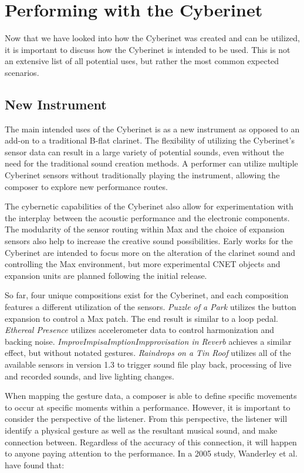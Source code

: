 \chapter{Performing with the Cyberinet}
Now that we have looked into how the Cyberinet was created and can be utilized, it is important to discuss how the Cyberinet is intended to be used. This is not an extensive list of all potential uses, but rather the most common expected scenarios.

\section{New Instrument}
The main intended uses of the Cyberinet is as a new instrument as opposed to an add-on to a traditional B-flat clarinet. The flexibility of utilizing the Cyberinet's sensor data can result in a large variety of potential sounds, even without the need for the traditional sound creation methods. A performer can utilize multiple Cyberinet sensors without traditionally playing the instrument, allowing the composer to explore new performance routes.

The cybernetic capabilities of the Cyberinet also allow for experimentation with the interplay between the acoustic performance and the electronic components. The modularity of the sensor routing within Max and the choice of expansion sensors also help to increase the creative sound possibilities. Early works for the Cyberinet are intended to focus more on the alteration of the clarinet sound and controlling the Max environment, but more experimental CNET objects and expansion units are planned following the initial release.

So far, four unique compositions exist for the Cyberinet, and each composition features a different utilization of the sensors. \textit{Puzzle of a Park} utilizes the button expansion to control a Max patch. The end result is similar to a loop pedal. \textit{Ethereal Presence} utilizes accelerometer data to control harmonization and backing noise. \textit{ImprovImpisaImptionImpprovisation in Reverb} achieves a similar effect, but without notated gestures. \textit{Raindrops on a Tin Roof} utilizes all of the available sensors in version 1.3 to trigger sound file play back, processing of live and recorded sounds, and live lighting changes.

When mapping the gesture data, a composer is able to define specific movements to occur at specific moments within a performance. However, it is important to consider the perspective of the listener\cite{KvifteJenseniusDescription}. From this perspective, the listener will identify a physical gesture as well as the resultant musical sound, and make connection between. Regardless of the accuracy of this connection, it will happen to anyone paying attention to the performance. In a 2005 study, Wanderley et al. have found that:

